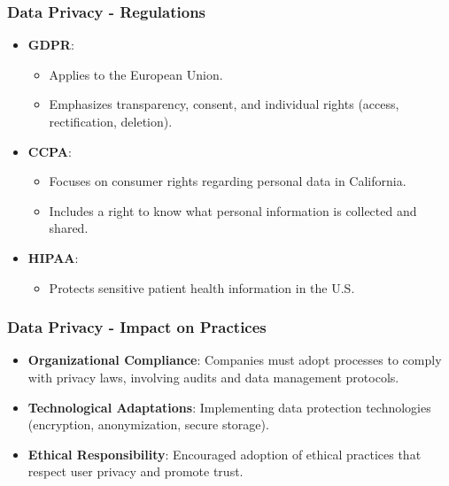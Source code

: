 \documentclass[aspectratio=169]{beamer}
\begin{document}
\begin{frame}[fragile]
    \frametitle{Data Privacy - Regulations}
    \begin{itemize}
        \item \textbf{GDPR}:
            \begin{itemize}
                \item Applies to the European Union.
                \item Emphasizes transparency, consent, and individual rights (access, rectification, deletion).
            \end{itemize}
        \item \textbf{CCPA}:
            \begin{itemize}
                \item Focuses on consumer rights regarding personal data in California.
                \item Includes a right to know what personal information is collected and shared.
            \end{itemize}
        \item \textbf{HIPAA}:
            \begin{itemize}
                \item Protects sensitive patient health information in the U.S.
            \end{itemize}
    \end{itemize}
\end{frame}

\begin{frame}[fragile]
    \frametitle{Data Privacy - Impact on Practices}
    \begin{itemize}
        \item \textbf{Organizational Compliance}: Companies must adopt processes to comply with privacy laws, involving audits and data management protocols.
        \item \textbf{Technological Adaptations}: Implementing data protection technologies (encryption, anonymization, secure storage).
        \item \textbf{Ethical Responsibility}: Encouraged adoption of ethical practices that respect user privacy and promote trust.
    \end{itemize}
\end{frame}
\end{document}
